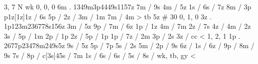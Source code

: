 3, 7
N
wk
0, 0, 0
6m . 
1349m3p4449s1157z 
7m / 9s 
4m / 5z 
1s / 
6s / 7z 
8m / 3p 
p1z[1z]1z / 6s 
5p / 
2z / 
3m / 1m 
7m / 4m 
> tb
5z # 30
%
0, 1, 0
3z .
1p123m236778s156z 
3m / 5z 
9p / 
7m / 6z 
1p / 1z 
4m / 7m 
2z / 7s 
4z / 
4m / 2z 
3s / 
5p / 1m 
2p / 1p 
2z / 
5p / 1p 
1p /
7z / 2m 
3p / 2s 
3z / 
cc < 
% 
1, 2, 1 
1p .
2677p23478m249s5z 
9s / 5z 
5p / 7p 
5s / 2s 
5m / 
2p / 9s 
6z / 
1s / 
6z / 
9p / 
8m / 9s 
7s / 
8p / 
c[3s]45s / 7m 
1s / 
6s / 
6s / 
5s / 
8s / 
wk, tb, gy < 
